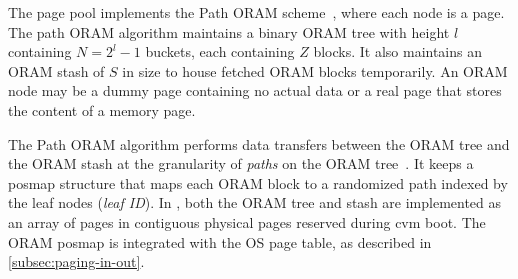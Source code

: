 \label{subsec:oram-page-pool}
The page pool implements the Path ORAM scheme~\cite{stefanov2018path}, where each node is a page.
The path ORAM algorithm maintains a binary ORAM tree with height $l$ containing $N = 2^l-1$ buckets, each containing $Z$ blocks.
It also maintains an ORAM stash of $S$ in size to house fetched ORAM blocks temporarily.
An ORAM node may be a dummy page containing no actual data or a real page that stores the content of a memory page.

The Path ORAM algorithm performs data transfers between the ORAM tree and the ORAM stash at the granularity of \emph{paths} on the ORAM tree~\cite{stefanov2018path}.
It keeps a \gls{posmap} structure that maps each ORAM block to a randomized path indexed by the leaf nodes (\emph{leaf ID}).
In \thename, both the ORAM tree and stash are implemented as an array of pages in contiguous physical pages reserved during \gls{cvm} boot.
The ORAM \gls{posmap} is integrated with the OS page table, as described in \cref{subsec:paging-in-out}.

